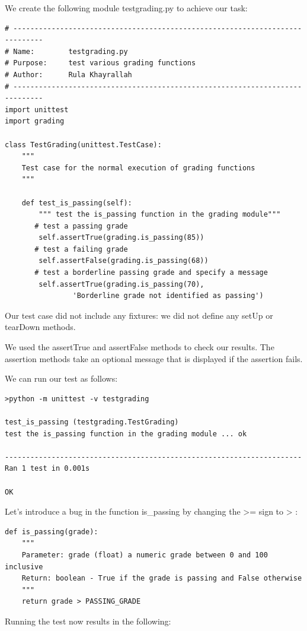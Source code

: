 \documentclass{article}
\begin{document}
We create the following module testgrading.py to achieve our task:
 
 \begin{lstlisting}
# -----------------------------------------------------------------------------
# Name:        testgrading.py
# Purpose:     test various grading functions
# Author:      Rula Khayrallah
# -----------------------------------------------------------------------------
import unittest
import grading
 
class TestGrading(unittest.TestCase):
    """
    Test case for the normal execution of grading functions
    """
 
    def test_is_passing(self):
        """ test the is_passing function in the grading module"""
       # test a passing grade
        self.assertTrue(grading.is_passing(85))
       # test a failing grade
        self.assertFalse(grading.is_passing(68))
       # test a borderline passing grade and specify a message
        self.assertTrue(grading.is_passing(70),
                'Borderline grade not identified as passing')
\end{lstlisting}

Our test case did not include any fixtures:  we did not define any setUp or tearDown methods.

We used the assertTrue and assertFalse methods to check our results.  The assertion methods take an optional message that is displayed if the assertion fails.

We can run our test as follows:

\begin{lstlisting}
>python -m unittest -v testgrading
 
test_is_passing (testgrading.TestGrading)
test the is_passing function in the grading module ... ok
 
----------------------------------------------------------------------
Ran 1 test in 0.001s
 
OK
\end{lstlisting}
 
Let's introduce a bug in the function is{\_}passing by changing the >= sign to > :
\begin{lstlisting}
def is_passing(grade):
    """
    Parameter: grade (float) a numeric grade between 0 and 100 inclusive
    Return: boolean - True if the grade is passing and False otherwise
    """
    return grade > PASSING_GRADE
\end{lstlisting}

Running the test now results in the following:
 
\end{document}
